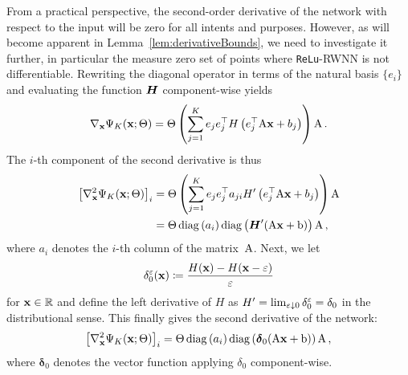 From a practical perspective, the second-order derivative of the network with respect to the input will be zero for all intents and purposes. 
However, as will become apparent in Lemma~\ref{lem:derivativeBounds}, we need to investigate it further, in particular the measure zero set of points where \texttt{ReLu}-RWNN is not differentiable. Rewriting the diagonal operator in terms of the natural basis $\{e_{i}\}$ and evaluating the function $\boldsymbol{H}$ component-wise yields
$$
\nabla_{\mathbf{x}}\Psi_K(\mathbf{x}; \Theta)=\Theta \left(\sum_{j=1}^{K} e_{j} e_{j}^\top H\left(e_{j}^\top \mathrm{A} \mathbf{x}+b_{j}\right) \right) \mathrm{A}\,.
$$
The $i$-th component of the second derivative is thus
\begin{align*}
\left[\nabla_{\mathbf{x}}^2\Psi_K(\mathbf{x}; \Theta)\right]_i
&= \Theta\left( \sum_{j=1}^{K} e_{j} e_{j}^\top a_{j i}H'\left(e_{j}^\top \mathrm{A} \mathbf{x}+b_{j}\right)\right)\mathrm{A} \\
&= \Theta \operatorname{diag} \left(a_{i}\right) \operatorname{diag} \left(\boldsymbol{H}'(\mathrm{A} \mathbf{x}+\mathrm{b})\right) \mathrm{A}\,,
\end{align*}
where $a_i$ denotes the $i$-th column of the matrix~$\mathrm{A}$. 
Next, we let
$$\delta_0^{\varepsilon}(\mathbf{x}) \coloneqq \frac{H(\mathbf{x})-H(\mathbf{x}-\varepsilon)}{\varepsilon}$$
for $\mathbf{x}\in\mathbb{R}$ and define the left derivative of $H$ as $H'=\lim_{\varepsilon\downarrow 0}\delta_0^\varepsilon=\delta_0$ in the distributional sense. This finally gives the second derivative of the network:
$$
\left[\nabla_{\mathbf{x}}^2\Psi_K(\mathbf{x}; \Theta)\right]_i
 = \Theta\operatorname{diag}\left(a_{i}\right)\operatorname{diag}\left(\boldsymbol\delta_0(\mathrm{A} \mathbf{x}+\mathrm{b})\right) \mathrm{A}\,,
$$
where $\boldsymbol \delta_0$ denotes the vector function applying $\delta_0$ component-wise.


